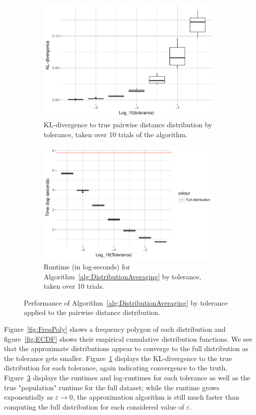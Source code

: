 \documentclass{article}
\begin{document}
\begin{figure}
\begin{subfigure}{.5\textwidth}
        \includegraphics[width=\linewidth]{Figures/PairwiseDistance/div_by_tol.pdf}
    	\caption{KL-divergence to true pairwise distance distribution by tolerance, taken over 10 trials of the algorithm.}
    	\label{fig:Divergences}
	\end{subfigure}
    \begin{subfigure}{.5\textwidth}
    	\includegraphics[width=0.9\linewidth]{Figures/PairwiseDistance/log_time_by_tol.pdf}
    	\caption{Runtime (in log-seconds) for Algorithm~\ref{alg:DistributionAveraging} by tolerance, taken over 10 trials.}
    	\label{fig:Times}
    \end{subfigure}
    \caption{Performance of Algorithm~\ref{alg:DistributionAveraging} by tolerance applied to the pairwise distance distribution.}
\end{figure}
Figure~\ref{fig:FreqPoly} shows a frequency polygon of each distribution and figure~\ref{fig:ECDF} shows their empirical cumulative distribution functions.
We see that the approximate distributions appear to converge to the full distribution as the tolerance gets smaller.
Figure~\ref{fig:Divergences} displays the KL-divergence to the true distribution for each tolerance, again indicating convergence to the truth.
Figure~\ref{fig:Times} displays the runtimes and log-runtimes for each tolerance as well as the true "population" runtime for the full dataset; while the runtime grows exponentially as $\varepsilon \to 0$, the approximation algorithm is still much faster than computing the full distribution for each considered value of $\varepsilon$.
\end{document}
